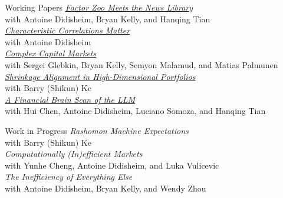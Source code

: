 \documentclass{resume}
\begin{document}
\begin{rSection}{Working Papers}
\href{https://papers.ssrn.com/sol3/papers.cfm?abstract_id=7693359}{\textit{Factor Zoo Meets the News Library}} \\
with Antoine Didisheim, Bryan Kelly, and Hanqing Tian \\ [-0.9em]

\href{https://papers.ssrn.com/sol3/papers.cfm?abstract_id=7562238}{\textit{Characteristic Correlations Matter}} \\
with Antoine Didisheim \\ [-0.9em]

\href{https://papers.ssrn.com/sol3/papers.cfm?abstract_id=7687139}{\textit{Complex Capital Markets}} \\
with Sergei Glebkin, Bryan Kelly, Semyon Malamud, and Matias Palmunen \\ [-0.9em]

\href{https://papers.ssrn.com/sol3/papers.cfm?abstract_id=5723922}{\textit{Shrinkage Alignment in High-Dimensional Portfolios}} \\
with Barry (Shikun) Ke \\ [-0.9em]

\href{https://papers.ssrn.com/sol3/papers.cfm?abstract_id=5412277}{\textit{A Financial Brain Scan of the LLM}} \\
with Hui Chen, Antoine Didisheim, Luciano Somoza, and Hanqing Tian \\ [-0.9em]
\end{rSection}

\begin{rSection}{Work in Progress}
\textit{Rashomon Machine Expectations} \\
with Barry (Shikun) Ke \\ [-0.9em]

\textit{Computationally (In)efficient Markets} \\
with Yunhe Cheng, Antoine Didisheim, and Luka Vulicevic \\ [-0.9em]

\textit{The Inefficiency of Everything Else} \\
with Antoine Didisheim, Bryan Kelly, and Wendy Zhou \\ [-0.9em]
\end{rSection}
\end{document}
